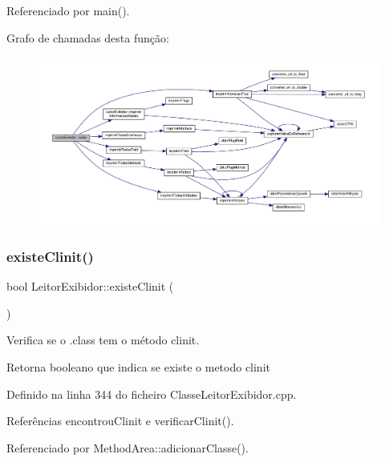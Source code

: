 Referenciado por main().

Grafo de chamadas desta função\+:
\nopagebreak
\begin{figure}[H]
\begin{center}
\leavevmode
\includegraphics[width=350pt]{classLeitorExibidor_a544bd7574553d9015b22c2507971e7f5_cgraph}
\end{center}
\end{figure}
\mbox{\label{classLeitorExibidor_a5a3ef889b1e38506d9d0df17255cad4e}} 
\subsubsection{\texorpdfstring{existe\+Clinit()}{existeClinit()}}
{\footnotesize\ttfamily bool Leitor\+Exibidor\+::existe\+Clinit (\begin{DoxyParamCaption}{ }\end{DoxyParamCaption})}



Verifica se o .class tem o método clinit. 

\begin{DoxyReturn}{Retorna}
booleano que indica se existe o metodo clinit 
\end{DoxyReturn}


Definido na linha 344 do ficheiro Classe\+Leitor\+Exibidor.\+cpp.



Referências encontrou\+Clinit e verificar\+Clinit().



Referenciado por Method\+Area\+::adicionar\+Classe().

